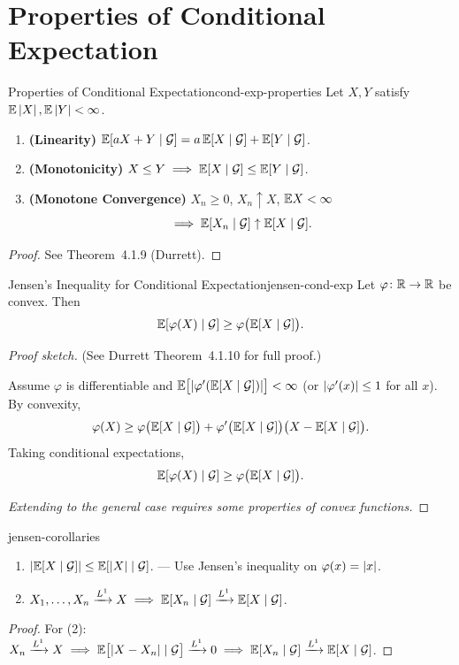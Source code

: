 \section{Properties of Conditional Expectation}

\begin{theorem}{Properties of Conditional Expectation}{cond-exp-properties}
    Let $X, Y$ satisfy $\mathbb{E}\left|X\right|, \mathbb{E}\left|Y\right| < \infty$.
    \begin{enumerate}[label=(\alph*)]
        \item \textbf{(Linearity)} $\mathbb{E}[aX + Y \mid \mathcal{G}] = a\,\mathbb{E}[X \mid \mathcal{G}] + \mathbb{E}[Y \mid \mathcal{G}]$.
        \item \textbf{(Monotonicity)} $X \leq Y \implies \mathbb{E}[X \mid \mathcal{G}] \leq \mathbb{E}[Y \mid \mathcal{G}]$.
        \item \textbf{(Monotone Convergence)} $X_n \geq 0$, $X_n \uparrow X$, $\mathbb{E} X < \infty$
        \[
            \implies \mathbb{E}[X_n \mid \mathcal{G}] \uparrow \mathbb{E}[X \mid \mathcal{G}].
        \]
    \end{enumerate}
\end{theorem}

\begin{proof}
    See Theorem~4.1.9 (Durrett).
\end{proof}

\begin{theorem}{Jensen's Inequality for Conditional Expectation}{jensen-cond-exp}
    Let $\varphi \colon \mathbb{R} \to \mathbb{R}$ be convex. Then
    \[
        \mathbb{E}[\varphi(X) \mid \mathcal{G}] \geq \varphi\bigl(\mathbb{E}[X \mid \mathcal{G}]\bigr).
    \]
\end{theorem}

\begin{proof}[Proof sketch]
    (See Durrett Theorem~4.1.10 for full proof.)

    Assume $\varphi$ is differentiable and $\mathbb{E}\bigl[\left|\varphi'(\mathbb{E}[X \mid \mathcal{G}])\right|\bigr] < \infty$ (or $\left|\varphi'(x)\right| \leq 1$ for all $x$). By convexity,
    \[
        \varphi(X) \geq \varphi\bigl(\mathbb{E}[X \mid \mathcal{G}]\bigr) + \varphi'\bigl(\mathbb{E}[X \mid \mathcal{G}]\bigr)\bigl(X - \mathbb{E}[X \mid \mathcal{G}]\bigr).
    \]
    Taking conditional expectations,
    \[
        \mathbb{E}[\varphi(X) \mid \mathcal{G}] \geq \varphi\bigl(\mathbb{E}[X \mid \mathcal{G}]\bigr).
    \]

    \textit{Extending to the general case requires some properties of convex functions.}
\end{proof}

\begin{corollary}{}{jensen-corollaries}
    \begin{enumerate}[label=(\arabic*)]
        \item $\left|\mathbb{E}[X \mid \mathcal{G}]\right| \leq \mathbb{E}[\left|X\right| \mid \mathcal{G}]$. \quad --- Use Jensen's inequality on $\varphi(x) = \left|x\right|$.
        \item $X_1, \ldots, X_n \xrightarrow{L^{1}} X \implies \mathbb{E}[X_n \mid \mathcal{G}] \xrightarrow{L^{1}} \mathbb{E}[X \mid \mathcal{G}]$.
    \end{enumerate}
\end{corollary}

\begin{proof}
    For (2): $X_n \xrightarrow{L^{1}} X \implies \mathbb{E}\bigl[\left|X - X_n\right| \mid \mathcal{G}\bigr] \xrightarrow{L^{1}} 0 \implies \mathbb{E}[X_n \mid \mathcal{G}] \xrightarrow{L^{1}} \mathbb{E}[X \mid \mathcal{G}]$.
\end{proof}
